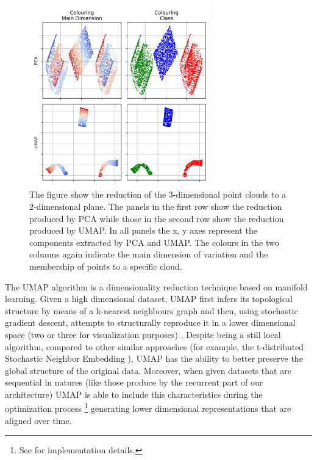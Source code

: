 \label{dim_reduction}
\begin{figure}[!htb]
  \centering
  \includegraphics[width=0.7\textwidth]{images/chapter_4/reduced.png}
    \caption[\textbf{PCA and UMAP reduction of Swiss roll and square}]{The figure show the reduction of the 3-dimensional point clouds to a 2-dimensional plane. The panels in the first row show the reduction produced by PCA while those in the second row show the reduction produced by UMAP. In all panels the x, y axes represent the components extracted by PCA and UMAP. The colours in the two columns again indicate the main dimension of variation and the membership of points to a specific cloud.}
    \label{fig: swiss_reduce}
\end{figure}

The UMAP algorithm is a dimensionality reduction technique based on manifold learning. Given a high dimensional dataset, UMAP first infers its topological structure by means of a k-nearest neighbours graph and then, using stochastic gradient descent, attempts to structurally reproduce it in a lower dimensional space (two or three for visualization purposes) \cite{2018arXivUMAP}. Despite being a still local algorithm, compared to other similar approaches (for example, the t-distributed Stochastic Neighbor Embedding \cite{van2008visualizing}),  UMAP has the ability to better preserve the global structure of the original data. Moreover, when given datasets that are sequential in natures (like those produce by the recurrent part of our architecture) UMAP is able to include this characteristics during the optimization process \footnote{See \cite{alignedumap} for implementation details.} generating lower dimensional representations that are aligned over time. 

